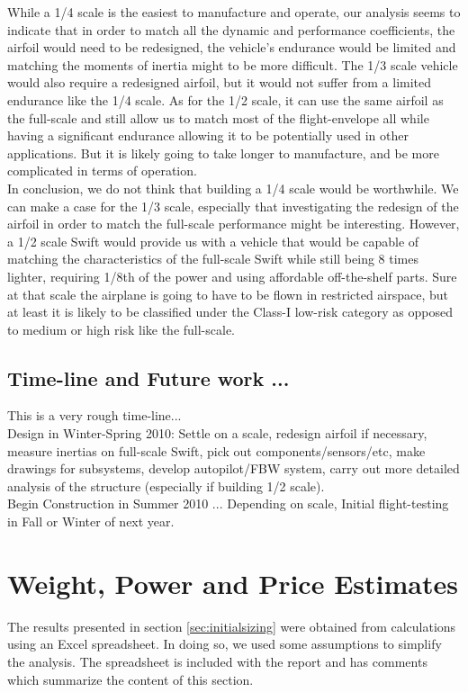 \documentclass[titlepage,10pt]{article}
\begin{document}
While a 1/4 scale is the easiest to manufacture and operate, our analysis seems to indicate that in order to match all the dynamic and performance coefficients, the airfoil would need to be redesigned, the vehicle's endurance would be limited and matching the moments of inertia might to be more difficult. The 1/3 scale vehicle would also require a redesigned airfoil, but it would not suffer from a limited endurance like the 1/4 scale. As for the 1/2 scale, it can use the same airfoil as the full-scale and still allow us to match most of the flight-envelope all while having a significant endurance allowing it to be potentially used in other applications. But it is likely going to take longer to manufacture, and be more complicated in terms of operation.\\

\enlargethispage{4 \baselineskip}
In conclusion, we do not think that building a 1/4 scale would be worthwhile. We can make a case for the 1/3 scale, especially that investigating the redesign of the airfoil in order to match the full-scale performance might be interesting. However, a 1/2 scale Swift would provide us with a vehicle that would be capable of matching the characteristics of the full-scale Swift while still being 8 times lighter, requiring 1/8th of the power and using affordable off-the-shelf parts. Sure at that scale the airplane is going to have to be flown in restricted airspace, but at least it is likely to be classified under the Class-I low-risk category as opposed to medium or high risk like the full-scale.


\newpage
\subsection{Time-line and Future work ... }
\enlargethispage{3 \baselineskip}
This is a very rough time-line... \\
Design in Winter-Spring 2010: Settle on a scale, redesign airfoil if necessary, measure inertias on full-scale Swift, pick out components/sensors/etc, make drawings for subsystems, develop autopilot/FBW system, carry out more detailed analysis of the structure (especially if building 1/2 scale).\\
Begin Construction in Summer 2010 ... Depending on scale, Initial flight-testing in Fall or Winter of next year.\\


\newpage
\appendix
\section{Weight, Power and Price Estimates}
\label{app:excel}
The results presented in section \ref{sec:initialsizing} were obtained from calculations using an Excel spreadsheet. In doing so, we used some assumptions to simplify the analysis. The spreadsheet is included with the report and has comments which summarize the content of this section.\\
\end{document}
